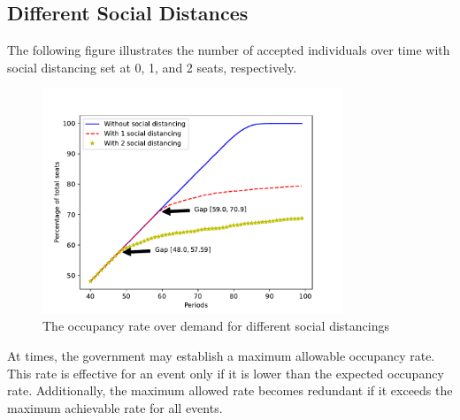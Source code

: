 \subsection*{Different Social Distances}
The following figure illustrates the number of accepted individuals over time with social distancing set at 0, 1, and 2 seats, respectively.

\begin{figure}[h]
  \centering
    \includegraphics[width=0.8\textwidth]{./Figures/distance.pdf}
  \caption{The occupancy rate over demand for different social distancings}
\end{figure}




At times, the government may establish a maximum allowable occupancy rate. This rate is effective for an event only if it is lower than the expected occupancy rate. Additionally, the maximum allowed rate becomes redundant if it exceeds the maximum achievable rate for all events.


